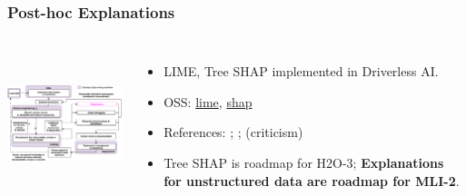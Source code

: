 \documentclass[11pt,
               aspectratio=169,
               hyperref={colorlinks}
               ]{beamer}
\begin{document}
			\begin{frame}
		
				\frametitle{Post-hoc Explanations}		
			
				\begin{columns}
	
					\centering
					\includegraphics[height=120pt]{img/exp.png}
				
					\vspace{-5pt}
					
					\small{
					\begin{itemize}
						\item LIME, Tree SHAP implemented in Driverless AI.
						\item OSS: \href{https://github.com/marcotcr/lime}{lime}, \href{https://github.com/slundberg/shap}{shap} 
						\item References: ; ;  (criticism)
						\item Tree SHAP is roadmap for H2O-3; \textbf{Explanations for unstructured data are roadmap for MLI-2}.
					\end{itemize}}
				
				\end{columns}
		
			\end{frame}
\end{document}
